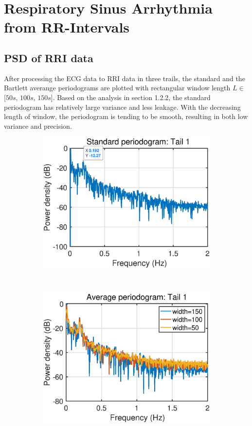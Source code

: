 \section{Respiratory Sinus Arrhythmia from RR-Intervals}
\subsection{PSD of RRI data}
After processing the ECG data to RRI data in three trails, the standard and the Bartlett averange periodograms are plotted with rectangular window length $L \in$ [$50s$, $100s$, $150s$]. Based on the analysis in section 1.2.2, the standard periodogram has relatively large variance and less leakage. With the decreasing length of window, the periodogram is tending to be smooth, resulting in both low variance and precision.
\begin{figure}[htb]
     \centering
     \begin{subfigure}{0.4\textwidth}
         \centering
         \includegraphics[width=\textwidth]{fig/15/15a1.eps}
     \end{subfigure}
     ~
     \begin{subfigure}{0.4\textwidth}
         \centering
         \includegraphics[width=\textwidth]{fig/15/15a2.eps}

\end{subfigure}
\end{figure}
